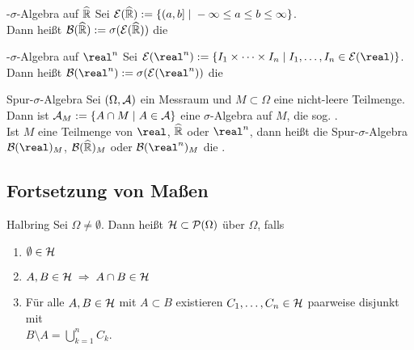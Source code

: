 \begin{Def}{-$\sigma$-Algebra auf $\widehat{\mathbb{R}}$}
    Sei $\mathcal{E}(\widehat{\mathbb{R}}) := \{(a, b] \;|\; -\infty \le a \le b \le \infty\}$.\\
    Dann heißt $\mathcal{B}(\widehat{\mathbb{R}}) := \sigma(\mathcal{E}(\widehat{\mathbb{R}}))$ die
\end{Def}

\begin{Def}{-$\sigma$-Algebra auf $\real^n$}
    Sei $\E(\real^n) :=
    \{I_1 \times \dotsb \times I_n \;|\; I_1, \dotsc, I_n \in \E(\real)\}$.\\
    Dann heißt $\B(\real^n) := \sigma(\E(\real^n))$ die
\end{Def}

\begin{Def}{Spur-$\sigma$-Algebra}
    Sei $(\Omega, \mathcal{A})$ ein Messraum und $M \subset \Omega$ eine nicht-leere Teilmenge.\\
    Dann ist $\mathcal{A}_M := \{A \cap M \;|\; A \in \mathcal{A}\}$ eine $\sigma$-Algebra auf $M$,
    die sog. .\\
    Ist $M$ eine Teilmenge von $\real$, $\widehat{\mathbb{R}}$ oder $\real^n$,
    dann heißt die Spur-$\sigma$-Algebra $\B(\real)_M$, $\mathcal{B}(\widehat{\mathbb{R}})_M$ oder $\B(\real^n)_M$
    die .
\end{Def}

\subsection{%
    Fortsetzung von Maßen%
}

\begin{Def}{Halbring}
    Sei $\Omega \not= \emptyset$.
    Dann heißt $\mathcal{H} \subset \mathcal{P}(\Omega)$  über $\Omega$, falls
    \begin{enumerate}
        \item
        $\emptyset \in \mathcal{H}$
        
        \item
        $A, B \in \mathcal{H} \;\Rightarrow\; A \cap B \in \mathcal{H}$
        
        \item
        Für alle $A, B \in \mathcal{H}$ mit $A \subset B$ existieren $C_1, \dotsc, C_n \in \mathcal{H}$
        paarweise disjunkt mit\\
        $B \setminus A = \bigcup_{k=1}^n C_k$.
    \end{enumerate}
\end{Def}

